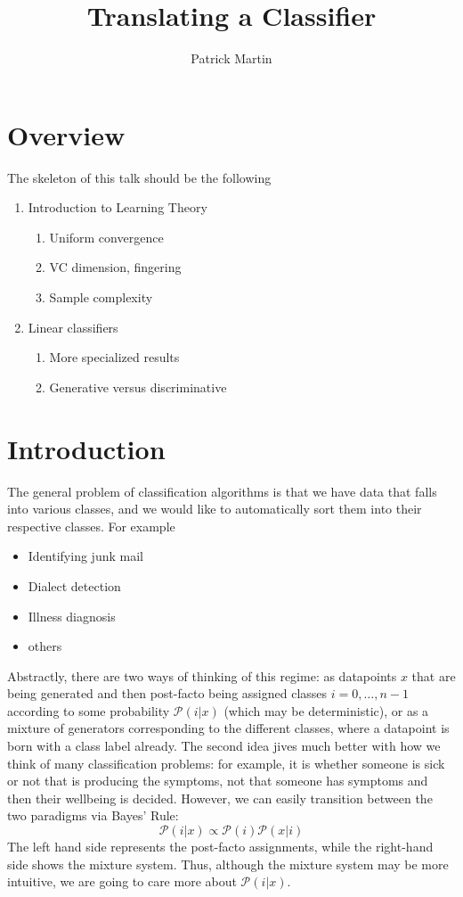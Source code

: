\documentclass[11pt]{article} %
\title{Translating a Classifier}
\author{Patrick Martin}
\renewcommand{\Pr}[1]{\mathcal{P} \left( #1 \right)}
\begin{document}
\maketitle

\section{Overview}
The skeleton of this talk should be the following
\begin{enumerate}
\item Introduction to Learning Theory
\begin{enumerate}
	\item Uniform convergence
	\item VC dimension, fingering
	\item Sample complexity
\end{enumerate}
\item Linear classifiers
\begin{enumerate}
	\item More specialized results
	\item Generative versus discriminative
\end{enumerate}
\end{enumerate}
\section{Introduction}

The general problem of classification algorithms is that we have data that falls into various classes, and we would like to automatically sort them into their respective classes. For example
\begin{itemize}
\item Identifying junk mail
\item Dialect detection
\item Illness diagnosis
\item others
\end{itemize}
Abstractly, there are two ways of thinking of this regime: as datapoints $x$ that are being generated and then post-facto being assigned classes $i=0,\ldots,n-1$ according to some probability $\Pr{i|x}$ (which may be deterministic), or as a mixture of generators corresponding to the different classes, where a datapoint is born with a class label already. The second idea jives much better with how we think of many classification problems: for example, it is whether someone is sick or not that is producing the symptoms, not that someone has symptoms and then their wellbeing is decided. However, we can easily transition between the two paradigms via Bayes' Rule:
\[ \Pr{i|x} \propto  \Pr{i} \Pr{x|i} \]
The left hand side represents the post-facto assignments, while the right-hand side shows the mixture system. Thus, although the mixture system may be more intuitive, we are going to care more about $\Pr{i|x}$. 
\end{document}
